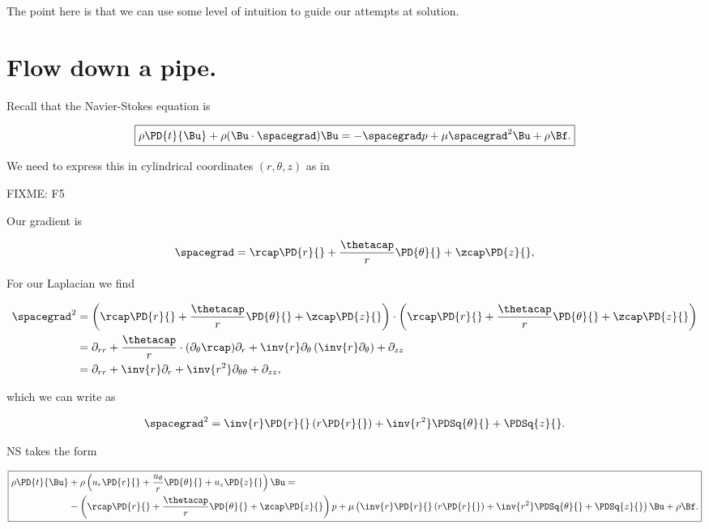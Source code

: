 The point here is that we can use some level of intuition to guide our attempts at solution.

\section{Flow down a pipe.}

Recall that the Navier-Stokes equation is

\begin{equation}\label{eqn:continuumL12:570}
\boxed{
\rho \PD{t}{\Bu} + \rho (\Bu \cdot \spacegrad) \Bu = - \spacegrad p + \mu \spacegrad^2 \Bu + \rho \Bf.
}
\end{equation}

We need to express this in cylindrical coordinates $(r, \theta, z)$ as in

FIXME: F5

Our gradient is 

\begin{equation}\label{eqn:classicalMechanicsPs2:610}
\spacegrad = 
\rcap \PD{r}{} + 
\frac{\thetacap}{r} \PD{\theta}{} + 
\zcap \PD{z}{},
\end{equation}

For our Laplacian we find

\begin{align*}
\spacegrad^2 &= 
\left(
\rcap \PD{r}{} + 
\frac{\thetacap}{r} \PD{\theta}{} + 
\zcap \PD{z}{}
\right)
 \cdot
\left(
\rcap \PD{r}{} + 
\frac{\thetacap}{r} \PD{\theta}{} + 
\zcap \PD{z}{}
\right) \\
&=
\partial_{rr} 
+ \frac{\thetacap}{r} \cdot (\partial_\theta \rcap) \partial_r
+ \inv{r} \partial_\theta \left( \inv{r} \partial_\theta \right)
+ \partial_{zz} \\
&=
\partial_{rr} + \inv{r} \partial_r + \inv{r^2} \partial_{\theta\theta} + \partial_{zz},
\end{align*}

which we can write as

\begin{equation}\label{eqn:continuumL12:630}
\spacegrad^2 = \inv{r} \PD{r}{} \left( r \PD{r}{} \right) + \inv{r^2} \PDSq{\theta}{} + \PDSq{z}{}.
\end{equation}

NS takes the form

\begin{equation}\label{eqn:classicalMechanicsPs2:650}
\boxed{
\begin{aligned}
\rho \PD{t}{\Bu} &+ \rho 
\left(
u_r \PD{r}{} + 
\frac{u_\theta}{r} \PD{\theta}{} + 
u_z \PD{z}{} \right) \Bu 
=  \\
&- 
\left(
\rcap \PD{r}{} + 
\frac{\thetacap}{r} \PD{\theta}{} + 
\zcap \PD{z}{}
\right)
p + \mu \left(
\inv{r} \PD{r}{} \left( r \PD{r}{} \right) + \inv{r^2} \PDSq{\theta}{} + \PDSq{z}{} \right)
\Bu + \rho \Bf.
\end{aligned}
}
\end{equation}

